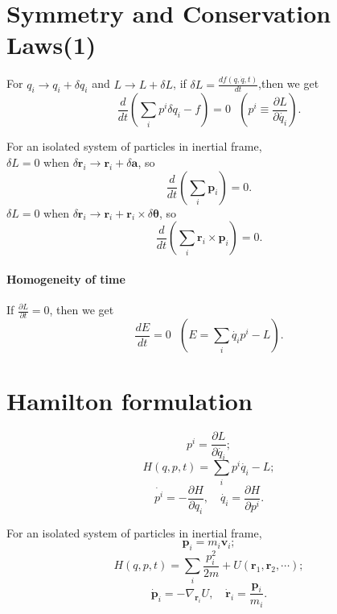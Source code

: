 \section{Symmetry and Conservation Laws(1)}
\begin{newthem}
For $q_i \to q_i+\delta q_i$ and $L \to L+\delta L$, if $\delta L= \frac{d f(q,\dot{q},t)}{dt}$,then we get
\[\frac{d}{dt}(\sum_i p^i \delta q_i-f)=0 \ \ \ (p^i  \equiv  \frac{\partial L}{\partial \dot{q_i}}).\]
\end{newthem}
\begin{example}
For an isolated system of particles in inertial frame,\\ 
$\delta L = 0$ when $\delta \bm{r}_i \rightarrow \bm{r}_i + \delta \bm{a}$, so
\[\frac{d}{dt} (\sum_i \bm{p}_i) = 0.\]
$\delta L = 0$ when $\delta \bm{r}_i \rightarrow \bm{r}_i + \bm{r}_i \times \delta \bm{\theta}$, so
\[\frac{d}{dt} (\sum_i \bm{r}_i \times \bm{p}_i) = 0.\]
\end{example}

\paragraph{Homogeneity of time}
If $\frac{\partial L}{\partial t}=0$, then we get
\[\frac{dE}{dt}=0 \ \ \ (E=\sum_i \dot{q_i}p^i-L).\]

\section{Hamilton formulation}
\[p^i = \frac{\partial L}{\partial \dot{q_i}};\]
\[H(q,p,t)=\sum_i p^i \dot{q_i}-L;\]
\[\dot{p^i}=-\frac{\partial H}{\partial q_i}, \quad \dot{q_i}=\frac{\partial H}{\partial p^i}.\]
\begin{example}
 For an isolated system of particles in inertial frame, 
\[\bm{p}_i = m_i \bm{v}_i;\]
\[H(q,p,t)=\sum_i \frac{p_i^2}{2m} + U(\bm{r}_1,\bm{r}_2,\cdots);\]
\[\dot{\bm{p}}_i =-\nabla_{\bm{r}_i} U, \quad \dot{\bm{r}}_i = \frac{\bm{p}_i}{m_i}.\]
\end{example}
 
